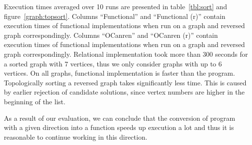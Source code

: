 Execution times averaged over 10 runs are presented in table~\ref{tbl:sort} and figure~\ref{graph:topsort}.
Columns ``Functional'' and ``Functional (r)'' contain execution times of functional implementations when run on a graph and reversed graph correspondingly.
Columns ``OCanren'' and ``OCanren (r)'' contain execution times of functional implementations when run on a graph and reversed graph correspondingly.
Relational implementation took more than 300 seconds for a sorted graph with 7 vertices, thus we only consider graphs with up to 6 vertices.
On all graphs, functional implementation is faster than the \mk program.
Topologically sorting a reversed graph takes significantly less time.
This is caused by earlier rejection of candidate solutions, since vertex numbers are higher in the beginning of the list.

As a result of our evaluation, we can conclude that the conversion of \mk program with a given direction into a function speeds up execution a lot and thus it is reasonable to continue working in this direction.


